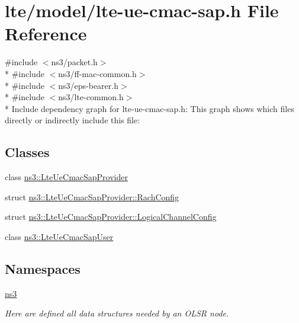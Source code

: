 \hypertarget{lte-ue-cmac-sap_8h}{}\section{lte/model/lte-\/ue-\/cmac-\/sap.h File Reference}
\label{lte-ue-cmac-sap_8h}
{\ttfamily \#include $<$ns3/packet.\+h$>$}\\*
{\ttfamily \#include $<$ns3/ff-\/mac-\/common.\+h$>$}\\*
{\ttfamily \#include $<$ns3/eps-\/bearer.\+h$>$}\\*
{\ttfamily \#include $<$ns3/lte-\/common.\+h$>$}\\*
Include dependency graph for lte-\/ue-\/cmac-\/sap.h\+:
This graph shows which files directly or indirectly include this file\+:
\subsection*{Classes}
\begin{DoxyCompactItemize}
\item 
class \hyperlink{classns3_1_1LteUeCmacSapProvider}{ns3\+::\+Lte\+Ue\+Cmac\+Sap\+Provider}
\item 
struct \hyperlink{structns3_1_1LteUeCmacSapProvider_1_1RachConfig}{ns3\+::\+Lte\+Ue\+Cmac\+Sap\+Provider\+::\+Rach\+Config}
\item 
struct \hyperlink{structns3_1_1LteUeCmacSapProvider_1_1LogicalChannelConfig}{ns3\+::\+Lte\+Ue\+Cmac\+Sap\+Provider\+::\+Logical\+Channel\+Config}
\item 
class \hyperlink{classns3_1_1LteUeCmacSapUser}{ns3\+::\+Lte\+Ue\+Cmac\+Sap\+User}
\end{DoxyCompactItemize}
\subsection*{Namespaces}
\begin{DoxyCompactItemize}
\item 
 \hyperlink{namespacens3}{ns3}
\begin{DoxyCompactList}\small\item\em Here are defined all data structures needed by an O\+L\+SR node. \end{DoxyCompactList}\end{DoxyCompactItemize}
